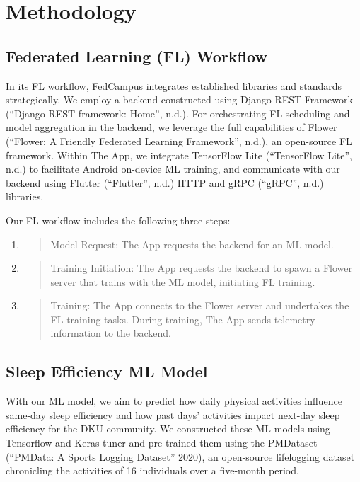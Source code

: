 \documentclass{article}
\begin{document}
\section{Methodology}

\subsection{Federated Learning (FL) Workflow}

In its FL workflow, FedCampus integrates established libraries and
standards strategically. We employ a backend constructed using Django
REST Framework (``Django REST framework: Home'', n.d.). For
orchestrating FL scheduling and model aggregation in the backend, we
leverage the full capabilities of Flower (``Flower: A Friendly Federated
Learning Framework'', n.d.), an open-source FL framework. Within The
App, we integrate TensorFlow Lite (``TensorFlow Lite'', n.d.) to
facilitate Android on-device ML training, and communicate with our
backend using Flutter (``Flutter'', n.d.) HTTP and gRPC (``gRPC'', n.d.)
libraries.

Our FL workflow includes the following three steps:

\begin{enumerate}
\def\labelenumi{\arabic{enumi}.}
\item
  \begin{quote}
  Model Request: The App requests the backend for an ML model.
  \end{quote}
\item
  \begin{quote}
  Training Initiation: The App requests the backend to spawn a Flower
  server that trains with the ML model, initiating FL training.
  \end{quote}
\item
  \begin{quote}
  Training: The App connects to the Flower server and undertakes the FL
  training tasks. During training, The App sends telemetry information
  to the backend.
  \end{quote}
\end{enumerate}

\subsection{Sleep Efficiency ML Model}

With our ML model, we aim to predict how daily physical activities
influence same-day sleep efficiency and how past days'
activities impact next-day sleep efficiency for the DKU community. We
constructed these ML models using Tensorflow and Keras tuner and
pre-trained them using the PMDataset (``PMData: A Sports Logging
Dataset'' 2020), an open-source lifelogging dataset chronicling the
activities of 16 individuals over a five-month period.
\end{document}
